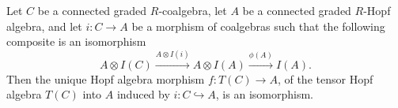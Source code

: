 Let $C$ be a connected graded $R$-coalgebra, let $A$ be a connected graded $R$-Hopf algebra, and let $i: C \to A$ be a morphism of coalgebras such that the following composite is an isomorphism
$$A \otimes I(C) \xrightarrow{A \otimes I(i)} A \otimes I(A) \xrightarrow{\phi(A)} I(A).$$
Then the unique Hopf algebra morphism $f: T(C) \to A$, of the tensor Hopf algebra $T(C)$ into $A$ induced by $i: C \hookrightarrow A$, is an isomorphism.
